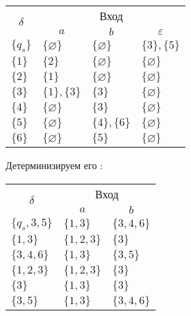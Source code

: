 \begin{enumerate}[label=(\roman{*})]
	\begin{center}
		\begin{tabular}{llll}
			\toprule
			\multicolumn{1}{c}{\multirow{2}{*}{\Large $\delta$}}
			& \multicolumn{3}{c}{Вход} \\
			\cmidrule(rl){2-4}
			& \multicolumn{1}{c}{$a$}
			& \multicolumn{1}{c}{$b$} 
			& \multicolumn{1}{c}{$\varepsilon$} \\
			\midrule
			$\{q_s\}$       & $\{\varnothing\}$      		 & $\{\varnothing\}$     &$\{3\}, \{5\}$  \\
			$\{1\}$       & $\{2\}$    			 & $\{\varnothing\}$     &$\{\varnothing\}$ \\
			$\{2\}$       & $\{1\}$    			 & $\{\varnothing\}$     &$\{\varnothing\}$  \\
			$\{3\}$       & $\{1\}, \{3\}$    			 & $\{3\}$     &$\{\varnothing\}$  \\
			$\{4\}$       & $\{\varnothing\}$    			 & $\{3\}$     &$\{\varnothing\}$  \\
			$\{5\}$ 		& $\{\varnothing\}$    			 & $\{4\}, \{6\}$     &$\{\varnothing\}$  \\
			$\{6\}$       & $\{\varnothing\}$    	 & $\{5\}$     &$\{\varnothing\}$  \\
			\bottomrule
		\end{tabular}
	\end{center}

	Детерминизируем его :
		
		\begin{center}
		\begin{tabular}{lll}
			\toprule
			\multicolumn{1}{c}{\multirow{2}{*}{\Large $\delta$}}
			& \multicolumn{2}{c}{Вход} \\
			\cmidrule(rl){2-3}
			& \multicolumn{1}{c}{$a$}
			& \multicolumn{1}{c}{$b$}  \\
			\midrule
			$\{q_s, 3, 5\}$       & $\{1, 3\}$      		 & $\{3, 4, 6\}$ \\
			$\{1, 3\}$       & $\{1, 2, 3\}$    			 & $\{3\}$    \\
			$\{3, 4, 6\}$       & $\{1, 3\}$    			 & $\{3, 5\}$     \\
			$\{1, 2, 3\}$       & $\{1, 2, 3\}$    			 & $\{3\}$     \\
			$\{3\}$       & $\{1, 3\}$    			 & $\{3\}$     \\
			$\{3, 5\}$       & $\{1, 3\}$    	 & $\{3, 4, 6\}$   \\
			\bottomrule
		\end{tabular}
	\end{center}


\end{enumerate}
